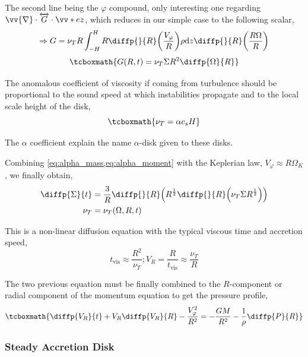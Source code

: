 \documentclass[10pt,a4paper,english]{article}
\let\originalleft\left
\let\originalright\right
\renewcommand{\left}{\mathopen{}\mathclose\bgroup\originalleft}
\renewcommand{\right}{\aftergroup\egroup\originalright}
\begin{document}
The second line being the $\varphi$ compound, only interesting one regarding
$\vv{\nabla} \cdot \overleftrightarrow{G} \cdot \vv*{e}{z}$, which reduces in
our simple case to the following scalar,
\begin{equation*}
    \Rightarrow G = \nu_T R \int_{-H}^H R \diffp{}{R} \left( \frac{V_\varphi}{R} \right) \rho \d{z} \diffp{}{R} \left(\frac{R \Omega}{R}\right)
\end{equation*}
\begin{equation}
    \tcboxmath{
        G(R,t) = \nu_T \Sigma R^2 \diffp{\Omega}{R}
    }
\end{equation}

The anomalous coefficient of viscosity if coming from turbulence should be
proportional to the sound speed at which instabilities propagate and to the
local scale height of the disk,
\begin{equation}
    \tcboxmath{
        \nu_T = \alpha c_s H
    }
\end{equation}

The $\alpha$ coefficient explain the name $\alpha$-disk given to these disks.

Combining \cref{eq:alpha_mass,eq:alpha_moment} with the Keplerian law,
$V_\varphi \approx R \Omega_K$, we finally obtain,
\begin{align*}
    \diffp{\Sigma}{t} &= \frac{3}{R} \diffp{}{R} \left( R^\frac{1}{2} \diffp{}{R} \left( \nu_T \Sigma R^\frac{1}{2} \right) \right) \\
    \nu_T &= \nu_T(\Omega,R,t)
\end{align*}

This is a non-linear diffusion equation with the typical viscous time and
accretion speed,
\begin{equation*}
    t_\mathrm{vis} \approx \frac{R^2}{\nu_T} ; V_R = \frac{R}{t_\mathrm{vis}} \approx \frac{\nu_T}{R}
\end{equation*}

The two previous equation must be finally combined to the $R$-component or
radial component of the momentum equation to get the pressure profile,
\begin{equation}
    \tcboxmath{
        \diffp{V_R}{t} + V_R \diffp{V_R}{R} - \frac{V_\varphi^2}{R^2} = - \frac{GM}{R^2} - \frac{1}{\rho} \diffp{P}{R}
    }
\end{equation}

\subsubsection{Steady Accretion Disk}
\end{document}
